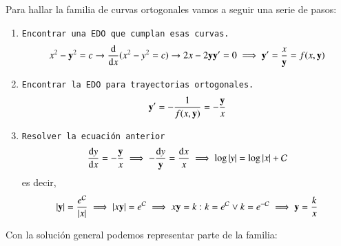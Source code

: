 \begin{eg}
\begin{center}
    \end{center}
    \vspace{5pt}
    Para hallar la familia de curvas ortogonales vamos a seguir una serie de pasos:
    \begin{enumerate}
        \item \texttt{Encontrar una EDO que cumplan esas curvas.}\\
            $$
                x^2-\mathbf{y}^2 = c \rightarrow \frac{\mathrm{d}}{\mathrm{d}x} (x^2-y^2=c) \rightarrow 2x - 2\mathbf{y}\mathbf{y'} = 0 \implies \mathbf{y'} = \frac{x}{\mathbf{y}} = f(x,\mathbf{y})
            $$
        \item \texttt{Encontrar la EDO para trayectorias ortogonales.}\\
            $$
                \mathbf{y'} = -\frac{1}{f(x, \mathbf{y})} = -\frac{\mathbf{y}}{x}
            $$
        \item \texttt{Resolver la ecuación anterior}\\
            $$
                \frac{\mathrm{d}y}{\mathrm{d}x} = -\frac{\mathbf{y}}{x} \implies -\frac{\mathrm{d} y}{\mathbf{y}} = \frac{\mathrm{d} x}{x} \implies \log|y| = \log|x| + \mathcal{C}
            $$
            es decir,
            $$
                |\mathbf{y}| = \frac{e^\mathcal{C}}{|x|} \implies |x\mathbf{y}| = e^\mathcal{C} \implies x\mathbf{y} = k : k = e^\mathcal{C} \lor k = e^{-\mathcal{C}} \implies \mathbf{y} = \frac{k}{x}
            $$
    \end{enumerate}
    Con la solución general podemos representar parte de la familia:
    \begin{center}
        \vspace{1mm}
        \hfill
\end{center}
\end{eg}
